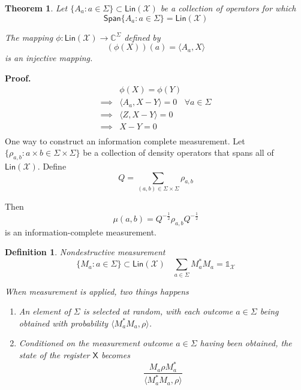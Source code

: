 \documentclass[aps,pra,onecolumn,notitlepage,superscriptaddress]{revtex4-1}
\newcommand{\C}{\mathbb{C}}
\newcommand{\reg}[1]{\mathsf{#1}}
\newcommand{\spc}[1]{\mathcal{#1}}
\newcommand{\Span}{{\mathsf{Span}}}
\newcommand{\Lin}{\mathsf{Lin}}
\def\>{\rangle}
\def\<{\langle}
\newcommand\I{\mathds{1}}
\newtheorem{theo}{Theorem}
\newtheorem{defi}{Definition}
\def\Proof{{\bf Proof.~}}
\begin{document}
    \begin{theo}
        Let $\{A_a : a \in \Sigma\} \subset \Lin(\spc X)$ be a collection of operators for which
        \begin{equation}
            \Span\{ A_a : a \in \Sigma \} = \Lin(\spc X)
        \end{equation}
        
        The mapping $\phi : \Lin(\spc X) \to \C^\Sigma$ defined by
        \begin{equation}
            (\phi(X))(a) = \< A_a, X \>
        \end{equation}
        is an injective mapping.
    \end{theo}
    \Proof {
        \begin{align*}
            &\phi(X) = \phi(Y) \\
            \implies& \< A_a, X-Y \> = 0 \ \ \ \ \forall a \in \Sigma \\
            \implies& \< Z, X-Y \> = 0 \\
            \implies& X-Y = 0 \\
        \end{align*}
    }
    One way to construct an information complete measurement. Let $\{\rho_{a,b} : a \times b \in \Sigma \times \Sigma \}$ be a collection of density operators that spans all of $\Lin(\spc X)$. Define
    \begin{equation}
        Q = \sum_{(a,b) \in \Sigma \times \Sigma} \rho_{a,b}
    \end{equation}

    Then
    \begin{equation}
        \mu(a,b) = Q^{-\frac{1}{2}} \rho_{a,b} Q^{-\frac{1}{2}}
    \end{equation}
    is an information-complete measurement.

    \begin{defi}
        Nondestructive measurement
        \begin{equation}
            \{ M_a : a \in \Sigma \} \subset \Lin(\spc X) \ \ \ \ \sum_{a \in \Sigma} M_a^*M_a = \I_{\spc X}
        \end{equation}

        When measurement is applied, two things happens
        \begin{enumerate}
            \item An element of $\Sigma$ is selected at random, with each outcome $a \in \Sigma$ being obtained with probability $\< M_a^*M_a, \rho \>$.
            \item Conditioned on the measurement outcome $a \in \Sigma$ having been obtained, the state of the register $\reg X$ becomes
            \begin{equation}
                \frac{M_a \rho M_a^*}{ \< M_a^*M_a, \rho \> }
            \end{equation}
        \end{enumerate}
    \end{defi}
\end{document}
